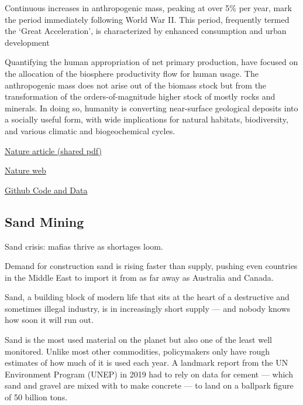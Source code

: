 \documentclass[
]{book}
\begin{document}
Continuous increases in anthropogenic mass, peaking at over 5\% per year,
mark the period immediately following World War II.
This period, frequently termed the `Great Acceleration',
is characterized by enhanced consumption and urban development

Quantifying the human appropriation of net primary production,
have focused on the allocation of the biosphere productivity flow for human usage.
The anthropogenic mass does not arise out of the biomass stock but from
the transformation of the orders-of-magnitude higher stock of mostly rocks and minerals.
In doing so, humanity is converting near-surface geological deposits into a socially useful form,
with wide implications for natural habitats, biodiversity, and various climatic and
biogeochemical cycles.

\href{https://www.nature.com/articles/s41586-020-3010-5.epdf?sharing_token=5BfrjXKSdktry3fKS7ssCdRgN0jAjWel9jnR3ZoTv0MLvUZ1C0L35yEQYHf_pwmiKx-xqIzWDg-_bH8WmUJdQjqDv1hJIWjUwOgpVde7Oc47mU9HfjoCpd8F0qewoXmjl6QNLlUMD2eeD21ompdgtw3j2FQ9z0hhBzCsqewC9BUQNhgBo5rYNFnTf9gTg419kTld3VXUhXOFlygv007wkcA8jVVlyrBd14KL3O0lNyCW54cq4jSFDWqF63iJKDWo_R6M1MFwDWk6OSU79I8W9ga2hbL-jY7gNoOR9LOhqUfR2c1P5oQrsITBs9UtutQEh--2BsxnLatS_s9_H68tUNKvlSYLF9xHfwWb-DXmoouJXov9L4EbWJH6itdSZHqa\&tracking_referrer=www.theguardian.com}{Nature article (shared pdf)}

\href{https://www.nature.com/articles/s41586-020-3010-5}{Nature web}

\href{https://github.com/milo-lab/anthropogenic_mass}{Github Code and Data}

\hypertarget{sand-mining}{%
\subsection{Sand Mining}\label{sand-mining}}

Sand crisis: mafias thrive as shortages loom.

Demand for construction sand is rising faster than supply, pushing even countries in the Middle East to import it from as far away as Australia and Canada.

Sand, a building block of modern life that sits at the heart of a destructive and sometimes illegal industry, is in increasingly short supply --- and nobody knows how soon it will run out.

Sand is the most used material on the planet but also one of the least well monitored. Unlike most other commodities, policymakers only have rough estimates of how much of it is used each year. A landmark report from the UN Environment Program (UNEP) in 2019 had to rely on data for cement --- which sand and gravel are mixed with to make concrete --- to land on a ballpark figure of 50 billion tons.
\end{document}
